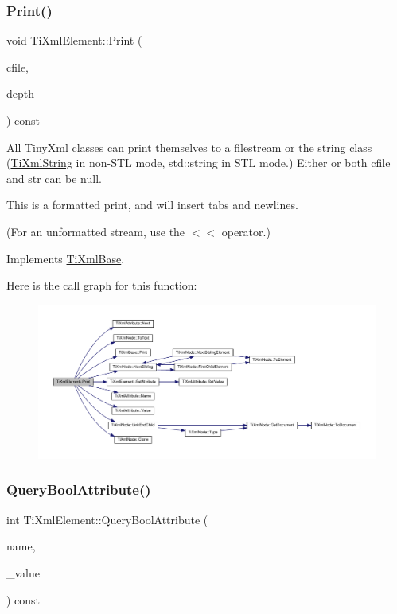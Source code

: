\subsubsection{\texorpdfstring{Print()}{Print()}}
{\footnotesize\ttfamily void Ti\+Xml\+Element\+::\+Print (\begin{DoxyParamCaption}\item[{F\+I\+LE $\ast$}]{cfile,  }\item[{int}]{depth }\end{DoxyParamCaption}) const\hspace{0.3cm}{\ttfamily [virtual]}}

All Tiny\+Xml classes can print themselves to a filestream or the string class (\hyperlink{classTiXmlString}{Ti\+Xml\+String} in non-\/\+S\+TL mode, std\+::string in S\+TL mode.) Either or both cfile and str can be null.

This is a formatted print, and will insert tabs and newlines.

(For an unformatted stream, use the $<$$<$ operator.) 

Implements \hyperlink{classTiXmlBase_a0de56b3f2ef14c65091a3b916437b512}{Ti\+Xml\+Base}.

Here is the call graph for this function\+:
\nopagebreak
\begin{figure}[H]
\begin{center}
\leavevmode
\includegraphics[width=350pt]{classTiXmlElement_aa31a15cddfb8601a31236fe7d2569fb4_cgraph}
\end{center}
\end{figure}
\mbox{\label{classTiXmlElement_a5789b1488af75b6ae37a749700495ceb}} 
\subsubsection{\texorpdfstring{Query\+Bool\+Attribute()}{QueryBoolAttribute()}}
{\footnotesize\ttfamily int Ti\+Xml\+Element\+::\+Query\+Bool\+Attribute (\begin{DoxyParamCaption}\item[{const char $\ast$}]{name,  }\item[{bool $\ast$}]{\+\_\+value }\end{DoxyParamCaption}) const}

